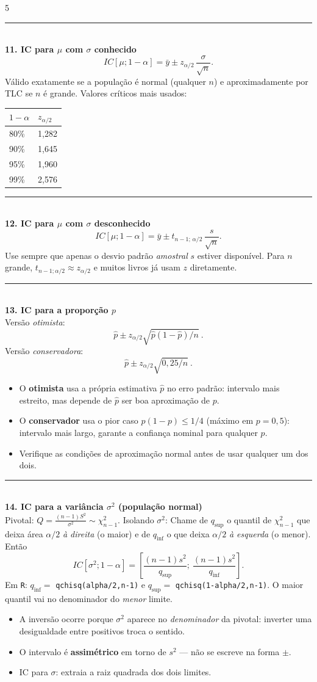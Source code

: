 \documentclass[a4paper,8pt]{extarticle}
\newcommand{\tit}[1]{\vspace{2pt}\textcolor{azul}{\rule{\linewidth}{0.6pt}}\\[1pt]\textbf{\textcolor{azul}{#1}}\\[1pt]}
\newcommand{\R}[1]{\texttt{\footnotesize #1}}
\begin{document}
\begin{multicols*}{5}
\tit{11. IC para $\mu$ com $\sigma$ conhecido}
\[IC[\mu;1-\alpha]=\bar y \pm z_{\alpha/2}\,\frac{\sigma}{\sqrt n}.\]
Válido exatamente se a população é normal (qualquer $n$) e aproximadamente por TLC se $n$ é grande.
Valores críticos mais usados:
\begin{center}
\begin{tabular}{@{}ll@{}}
\toprule
$1-\alpha$ & $z_{\alpha/2}$\\
\midrule
80\% & 1,282\\
90\% & 1,645\\
95\% & 1,960\\
99\% & 2,576\\
\bottomrule
\end{tabular}
\end{center}

\tit{12. IC para $\mu$ com $\sigma$ desconhecido}
\[IC[\mu;1-\alpha]=\bar y \pm t_{n-1;\,\alpha/2}\,\frac{s}{\sqrt n}.\]
Use sempre que apenas o desvio padrão \emph{amostral} $s$ estiver disponível. Para $n$ grande, $t_{n-1;\alpha/2}\approx z_{\alpha/2}$ e muitos livros já usam $z$ diretamente.

\tit{13. IC para a proporção $p$}
Versão \emph{otimista}:
\[\hat p \pm z_{\alpha/2}\sqrt{\hat p(1-\hat p)/n}\ .\]
Versão \emph{conservadora}:
\[\hat p \pm z_{\alpha/2}\sqrt{0{,}25/n}\ .\]
\begin{itemize}
\item O \textbf{otimista} usa a própria estimativa $\hat p$ no erro padrão: intervalo mais estreito, mas depende de $\hat p$ ser boa aproximação de $p$.
\item O \textbf{conservador} usa o pior caso $p(1-p)\le 1/4$ (máximo em $p=0{,}5$): intervalo mais largo, garante a confiança nominal para qualquer $p$.
\item Verifique as condições de aproximação normal antes de usar qualquer um dos dois.
\end{itemize}

\tit{14. IC para a variância $\sigma^2$ (população normal)}
Pivotal: $Q=\frac{(n-1)S^2}{\sigma^2}\sim\chi^2_{n-1}$. Isolando $\sigma^2$:
Chame de $q_{\sup}$ o quantil de $\chi^2_{n-1}$ que deixa área $\alpha/2$ \emph{à direita} (o maior) e de $q_{\inf}$ o que deixa $\alpha/2$ \emph{à esquerda} (o menor). Então
\[IC[\sigma^2;1-\alpha]=\left[\frac{(n-1)s^2}{q_{\sup}};\ \frac{(n-1)s^2}{q_{\inf}}\right].\]
Em \R{R}: $q_{\inf}=$ \R{qchisq(alpha/2,n-1)} e $q_{\sup}=$ \R{qchisq(1-alpha/2,n-1)}. O maior quantil vai no denominador do \emph{menor} limite.
\begin{itemize}
\item A inversão ocorre porque $\sigma^2$ aparece no \emph{denominador} da pivotal: inverter uma desigualdade entre positivos troca o sentido.
\item O intervalo é \textbf{assimétrico} em torno de $s^2$ — não se escreve na forma $\pm$.
\item IC para $\sigma$: extraia a raiz quadrada dos dois limites.
\end{itemize}


\end{multicols*}
\end{document}
